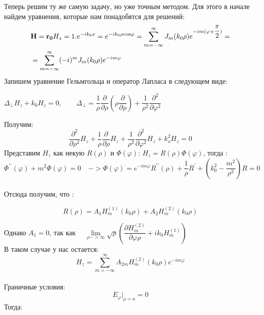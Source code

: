 Теперь решим ту же самую задачу, но уже точным методом. Для этого в начале найдем уравнения, которые нам понадобятся для решений:
\begin{align}
	&\vec{H} = \vec{r_{0}}H_{z}
	 = 1.e^{-ik_{0}x} = e^{-ik_{0}\rho \rm cos\varphi} = 
	\sum\limits_{m=-\infty}^{\infty} J_{m}(k_{0}\rho)e^{-im(\varphi + \dfrac{\pi}{2})} =\notag\\
	&= \sum\limits_{m=-\infty}^{\infty} (-i)^{m}J_{m}(k_{0}\rho)e^{-im\varphi}
\end{align}
Запишем уравнение Гельмгольца и оператор Лапласа в следующем виде:
\begin{center}
	$ 
	\Delta_{\perp}H_{z} + k_{0}H_{z} = 0, \qquad
	\Delta_{\perp} = \dfrac{1}{\rho}
	\dfrac{\partial}{\partial \rho} 
	(\rho \dfrac{\partial}{\partial \rho}) + 
	\dfrac{1}{\rho^{2}}
	\dfrac{\partial^{2}}{\partial \varphi^{2}} 
	$
\end{center}
Получим:
\begin{equation}
	\dfrac{\partial^{2}}{\partial \rho^{2}}H_{z}  +
\dfrac{1}{\rho}\dfrac{\partial}{\partial \rho}H_{z} +
\dfrac{1}{\rho^{2}}\dfrac{\partial^{2}}{\partial \varphi^{2}}H_{z}+
k_{o}^{2}H_{z} = 0
\end{equation}
Представим $ H_{z} $ как некую $ R(\rho) $ и $ \Phi(\varphi) $:\quad
$ H_{z} = R(\rho)\Phi(\varphi) $, \qquad тогда : \\
\begin{equation}
\Phi^{\prime\prime}(\varphi) + m^2\Phi(\varphi) = 0 \quad -> \Phi(\varphi) = e^{-im\varphi}R^{\prime\prime}(\rho) + \dfrac{1}{\rho} R^{\prime} + (k_{0}^{2} - \dfrac{m^{2}}{\rho^{2}})R = 0
\end{equation}
\\
Отсюда получим, что :
\begin{center}
	$$ R(\rho) = A_{1}H_{m}^{(1)}(k_{0}\rho) + A_{2}H_{m}^{(2)}(k_{0}\rho) $$
\end{center}
Однако \quad  $ A_{1} = 0 $, \quad так как
$\quad \lim\limits_{\rho -> \infty}\sqrt{\rho}
(\dfrac{\partial H_{m}^{(2)}}{\partial \varphi \rho} + ik_{0}H_{m}^{(1)} )
$ \\
В таком случае у нас остается: \\
$$
H_{z} = \sum_{m=-\infty}^{\infty}A_{2m}H_{m}^{(2)}(k_{0}\rho)e^{-im\varphi}
$$
\\
Граничные условия:
\begin{equation}
	E_{\varphi}|_{\rho=a} = 0
\end{equation}
Тогда:

